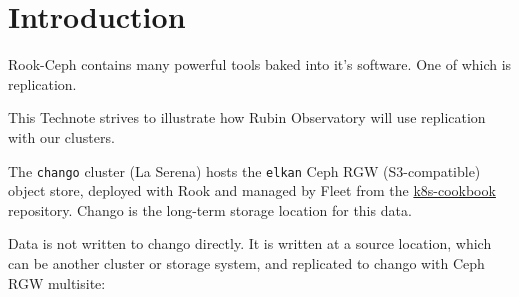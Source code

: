 \section{Introduction}

Rook-Ceph contains many powerful tools baked into it's software. One of which is replication.

This Technote strives to illustrate how Rubin Observatory will use replication with our clusters.

The \texttt{chango} cluster (La Serena) hosts the \texttt{elkan} Ceph RGW (S3-compatible) object store, deployed with Rook and managed by Fleet from the \href{https://github.com/lsst-it/k8s-cookbook}{k8s-cookbook} repository. Chango is the long-term storage location for this data.

Data is not written to chango directly. It is written at a source location, which can be another cluster or storage system, and replicated to chango with Ceph RGW multisite:
